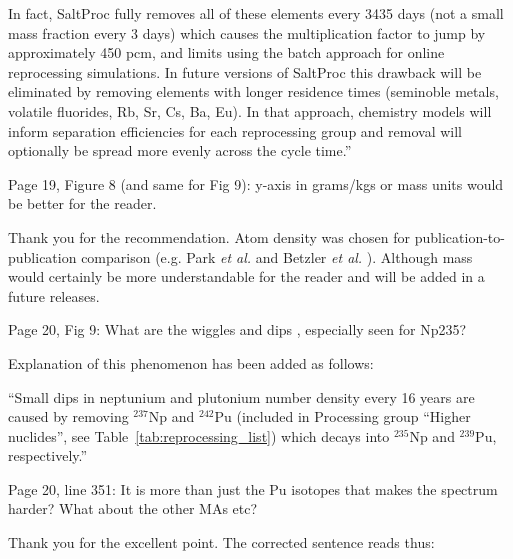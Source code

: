 \documentclass[answers,11pt]{exam}
\begin{document}
\begin{questions}
\begin{solution}
                        In fact, SaltProc fully removes
                        all of these elements every 3435 days (not a small mass fraction every 3 days)
                        which causes the multiplication factor to jump by approximately 450
                        pcm, and limits using the batch approach for online reprocessing simulations.
                        In future versions of SaltProc this drawback will be eliminated by removing
                        elements with longer residence times (seminoble metals, volatile fluorides, Rb, Sr,
                         Cs, Ba, Eu). In that approach, chemistry models will inform separation
                         efficiencies for each reprocessing group and removal will optionally be spread more
                         evenly across the cycle time.''
        \end{solution}

        \question  Page 19, Figure 8 (and same for Fig 9): y-axis in grams/kgs 
        or mass units would be better for the reader.
        \begin{solution}
                Thank you for the recommendation. Atom density was chosen for publication-to-						publication comparison (e.g. Park \emph{et al.} and Betzler \emph{et al.}
                \cite{park_whole_2015, betzler_molten_2017}). Although mass would certainly 
                be more understandable for the reader and will be added in a future releases.
        \end{solution}

        \question  Page 20, Fig 9: What are the wiggles and dips , especially 
        seen for Np235?
        \begin{solution}
		        Explanation of this phenomenon has been added as follows:

                          ``Small dips in neptunium and plutonium number density 
                          every 16 years are caused by removing $^{237}$Np and 
                          $^{242}$Pu (included in Processing group ``Higher 
                          nuclides'', see Table~\ref{tab:reprocessing_list}) 
                          which decays into $^{235}$Np and $^{239}$Pu, 
                          respectively.''
        \end{solution}

        \question  Page 20, line 351: It is more than just the Pu isotopes that 
        makes the spectrum harder? What about the other MAs etc?
        \begin{solution}
        		Thank you for the excellent point. The corrected sentence reads thus: 
        

\end{solution}
\end{questions}
\end{document}
